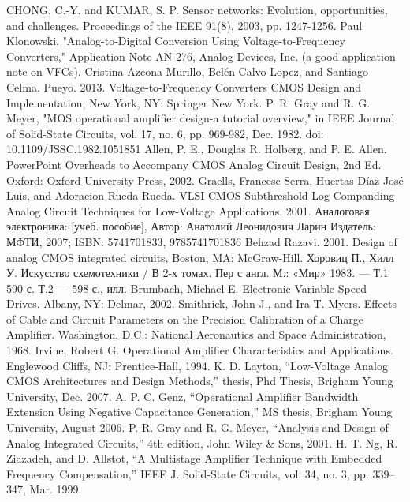 \documentclass[a4paper,12pt,oneside]{scrartcl}
\begin{document}
\cleardoublepage
\begin{thebibliography}{99}
 CHONG, C.-Y. and KUMAR, S. P. Sensor networks: Evolution, opportunities, and challenges. Proceedings of the IEEE 91(8), 2003, pp. 1247-1256.
 Paul Klonowski, "Analog-to-Digital Conversion Using Voltage-to-Frequency Converters," Application Note AN-276, Analog Devices, Inc. (a good application note on VFCs).
 Cristina Azcona Murillo, Belén Calvo Lopez, and Santiago Celma. Pueyo. 2013. Voltage-to-Frequency Converters CMOS Design and Implementation, New York, NY: Springer New York.
 P. R. Gray and R. G. Meyer, "MOS operational amplifier design-a tutorial overview," in IEEE Journal of Solid-State Circuits, vol. 17, no. 6, pp. 969-982, Dec. 1982.
doi: 10.1109/JSSC.1982.1051851
Allen, P. E., Douglas R. Holberg, and P. E. Allen. PowerPoint Overheads to Accompany CMOS Analog Circuit Design, 2nd Ed. Oxford: Oxford University Press, 2002.
Graells, Francesc Serra, Huertas Díaz José Luis, and Adoracion Rueda Rueda. VLSI CMOS Subthreshold Log Companding Analog Circuit Techniques for Low-Voltage Applications. 2001.
Аналоговая электроника: [учеб. пособие], Автор:	Анатолий Леонидович Ларин
Издатель: МФТИ, 2007; ISBN:	5741701833, 9785741701836
Behzad Razavi. 2001. Design of analog CMOS integrated circuits, Boston, MA: McGraw-Hill.
Хоровиц П., Хилл У. Искусство схемотехники / В 2-х томах. Пер с англ. М.: «Мир» 1983. — Т.1 590 с. Т.2 — 598 с., илл.
Brumbach, Michael E. Electronic Variable Speed Drives. Albany, NY: Delmar, 2002.
Smithrick, John J., and Ira T. Myers. Effects of Cable and Circuit Parameters on the Precision Calibration of a Charge Amplifier. Washington, D.C.: National Aeronautics and Space Administration, 1968.
Irvine, Robert G. Operational Amplifier Characteristics and Applications. Englewood Cliffs, NJ: Prentice-Hall, 1994.
K. D. Layton, “Low-Voltage Analog CMOS Architectures and Design Methods,” thesis, Phd Thesis, Brigham Young University, Dec. 2007.
A. P. C. Genz, “Operational Amplifier Bandwidth Extension Using Negative Capacitance Generation,” MS thesis, Brigham Young University, August 2006.
P. R. Gray and R. G. Meyer, “Analysis and Design of Analog Integrated Circuits,” 4th edition, John Wiley & Sons, 2001.
H. T. Ng, R. Ziazadeh, and D. Allstot, “A Multistage Amplifier Technique with Embedded Frequency Compensation,” IEEE J. Solid-State Circuits, vol. 34, no. 3, pp. 339–347, Mar. 1999.
\end{thebibliography}

\cleardoublepage
\end{document}
